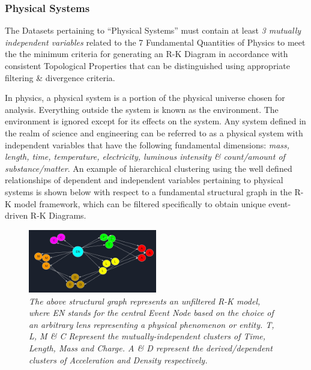 \subsubsection{Physical Systems}
\label{sec:PhysicalSystems}

The Datasets pertaining to “Physical Systems” must contain at least \textit{3 mutually independent variables} related to the 7 Fundamental Quantities of Physics \cite{23.0_DimensionalAnalysis} to meet the the minimum criteria for generating an  R-K Diagram in accordance with consistent Topological Properties that can be distinguished using appropriate filtering \& divergence criteria.

In physics, a physical system is a portion of the physical universe chosen for analysis. Everything outside the system is known as the environment. The environment is ignored except for its effects on the system. Any system defined in the realm of science and engineering can be referred to as a physical system with independent variables that have the following fundamental dimensions: \textit{mass, length, time, temperature, electricity, luminous intensity \& count/amount of substance/matter}. \cite{23.1_7FundamentalQuants} An example of hierarchical clustering using the well defined relationships of dependent and independent variables pertaining to physical systems is shown below with respect to a fundamental structural graph in the R-K model framework, which can be filtered specifically to obtain unique event-driven R-K Diagrams. 

\begin{figure}
	\centering
	\includegraphics[width=0.5\textwidth]{images/04_Physical Systems Dependent & Independent Variables.jpg}
	\caption{\textit{The above structural graph represents an unfiltered R-K model, where EN stands for the central Event Node based on the choice of an arbitrary lens representing a physical phenomenon or entity. T, L, M \& C Represent the mutually-independent clusters  of Time, Length, Mass and Charge. A \& D represent the derived/dependent clusters of Acceleration and Density respectively.}}
	\label{fig:PhysicalSystems}
\end{figure}

